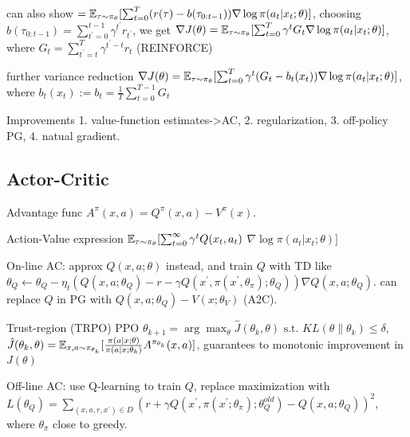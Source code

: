 can also show $=\mathbb{E}_{\tau {\small \sim} \pi_\theta}[\sum_{t=0}^T(r(\tau)-b(\tau_{0: t-1})) \nabla \log \pi(a_t | x_t ; \theta)]$, choosing $b(\tau_{0: t-1})=\sum_{t^{\prime}=0}^{t-1} \gamma^{t^{\prime}} r_{t^{\prime}}$, we get $\nabla J(\theta)=\mathbb{E}_{\tau {\small \sim} \pi_\theta}[\sum_{t=0}^T \gamma^t G_t \nabla \log \pi(a_t | x_t ; \theta)]$, where $G_t=\sum_{t^{\prime}=t}^T \gamma^{t^{\prime}-t} r_t$ (REINFORCE)

further variance reduction $\nabla J(\theta)=\mathbb{E}_{\tau {\small \sim} \pi_\theta}[\sum_{t=0}^T \gamma^t(G_t-b_t(x_t)) \nabla \log \pi(a_t | x_t ; \theta)]$, where $b_t(x_t):=b_t=\frac{1}{T} \sum_{t=0}^{T-1} G_t$

Improvements 1. value-function estimates->AC, 2. regularization, 3. off-policy PG, 4. natual gradient.

\subsection{Actor-Critic}

Advantage func $A^\pi(x, a)=Q^\pi(x, a)-V^\pi(x)$.

Action-Value expression $\mathbb{E}_{\tau {\small \sim} \pi_\theta}[\sum_{t=0}^{\infty}\gamma^t Q(x_t, a_t) $ $\nabla \log \pi(a_t | x_t ; \theta)]$

On-line AC: approx $Q(x,a;\theta)$ instead, and train $Q$ with TD like $\theta_Q \leftarrow \theta_Q-\eta_t(Q(x, a ; \theta_Q)-r-\gamma Q(x^{\prime}, \pi(x^{\prime}, \theta_\pi) ; \theta_Q)) \nabla Q(x, a ; \theta_Q)$. can replace $Q$ in PG with $Q(x, a ; \theta_Q)-V(x ; \theta_V)$ (A2C).

Trust-region (TRPO) PPO $\theta_{k+1}=\arg \max _\theta \hat{J}(\theta_k, \theta) \text { s.t. } K L(\theta \| \theta_k) \leq \delta$, $\hat{J}(\theta_k, \theta)=\mathbb{E}_{x, a {\small \sim} \pi_{\theta_k}}[\frac{\pi(a | x ; \theta)}{\pi(a | x ; \theta_k)} A^{\pi_{\theta_k}}(x, a)]$, guarantees to monotonic improvement in $J(\theta)$

Off-line AC: use Q-learning to train $Q$, replace maximization with $L(\theta_Q)=\sum_{(x, a, r, x^{\prime}) \in D}(r+\gamma Q(x^{\prime}, \pi(x^{\prime} ; \theta_\pi) ; \theta_Q^{o l d})-Q(x, a ; \theta_Q))^2$, where $\theta_\pi$ close to greedy.